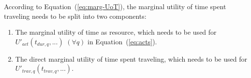 %
%
%

According to Equation~(\ref{eq:marg-UoT}), the marginal utility of time spent traveling needs to be split into two components:
%
\begin{enumerate}\styleEnumerate
%
\item The marginal utility of time as resource, which needs to be used for $U'_{act}(t_{dur,q},...)$ $(\forall q)$ in Equation~(\ref{eq:acts}).
%
\item The {direct marginal utility of time spent traveling}, which needs to be used for $U'_{trav,q}(t_{trav,q},...)$.
%
\end{enumerate}
%
